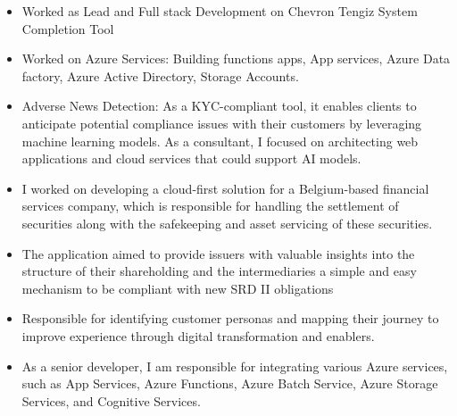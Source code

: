 \documentclass[10pt,a4paper,ragged2e,withhyper]{altacv}
\begin{document}
\begin{paracol}{2}


\begin{itemize}
\item  Worked as Lead and Full stack Development on Chevron 
     Tengiz System Completion Tool
\item Worked on Azure Services: Building functions apps, App services, Azure Data factory, Azure Active Directory, Storage Accounts.

\end{itemize}

\divider

\begin{itemize}
\item Adverse News Detection: As a KYC-compliant tool, it enables clients to anticipate potential compliance issues with their customers by leveraging machine learning models. As a consultant, I focused on architecting web applications and cloud services that could support AI models.  
\item I worked on developing a cloud-first solution for a Belgium-based financial services company, which is responsible for handling the settlement of securities along with the safekeeping and asset servicing of these securities.
\item The application aimed to provide issuers with valuable insights into the structure of their shareholding and the intermediaries a simple and easy mechanism to be compliant with new SRD II obligations

\end{itemize}

\divider

\begin{itemize}
\item Responsible for identifying customer personas and mapping their journey to improve experience through digital transformation and enablers.
\item As a senior developer, I am responsible for integrating various Azure services, such as App Services, Azure Functions, Azure Batch Service, Azure Storage Services, and Cognitive Services.


\end{itemize}
\end{paracol}
\end{document}
